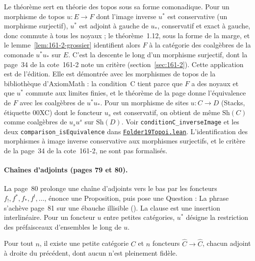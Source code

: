 \begin{remarque}
Le théorème sert en théorie des topos sous sa forme comonadique. Pour un morphisme de topos $u : E \to F$ dont l'image inverse $u^*$ est conservative (un morphisme surjectif), $u^*$ est adjoint à gauche de $u_*$, conservatif et exact à gauche, donc commute à tous les noyaux ; le théorème~1.12, sous la forme de la marge, et le lemme~\ref{lem:161-2-grossier} identifient alors $F$ à la catégorie des coalgèbres de la comonade $u^* u_*$ sur $E$. C'est la descente le long d'un morphisme surjectif, dont la page~34 de la cote~161-2 note un critère (section~\ref{sec:161-2}). Cette application est de l'édition. Elle est démontrée avec les morphismes de topos de la bibliothèque d'AxiomMath \cite{axiomstacks} : la condition~C tient parce que $F$ a des noyaux et que $u^*$ commute aux limites finies, et le théorème de la page donne l'équivalence de $F$ avec les coalgèbres de $u^* u_*$. Pour un morphisme de sites $u : C \to D$ (Stacks, étiquette 00XC) dont le foncteur $u_s$ est conservatif, on obtient de même $\mathrm{Sh}(C)$ comme coalgèbres de $u_s u^s$ sur $\mathrm{Sh}(D)$. Voir \texttt{conditionC\_inverseImage} et les deux \texttt{comparison\_isEquivalence} dans \href{\leanblobmain/CategoryTheory/Folder19Topoi.lean}{\texttt{Folder19Topoi.\allowbreak{}lean}}. L'identification des morphismes à image inverse conservative aux morphismes surjectifs, et le critère de la page~34 de la cote~161-2, ne sont pas formalisés.
\end{remarque}

\paragraph{Chaînes d'adjoints (pages 79 et 80).} La page~80 prolonge une chaîne d'adjoints vers le bas par les foncteurs $f_!, f^*, f_*, f^!, \ldots$, énonce une Proposition, puis pose une Question :  La phrase s'achève page~81 sur une ébauche illisible (). La clause  est une insertion interlinéaire. Pour un foncteur $u$ entre petites catégories, $u^*$ désigne la restriction des préfaisceaux d'ensembles le long de $u$.

\begin{encadre}
\begin{theoreme}\label{thm:19-chaine}
Pour tout $n$, il existe une petite catégorie $C$ et $n$ foncteurs $\widehat C \to \widehat C$, chacun adjoint à droite du précédent, dont aucun n'est pleinement fidèle.
\end{theoreme}
\end{encadre}

